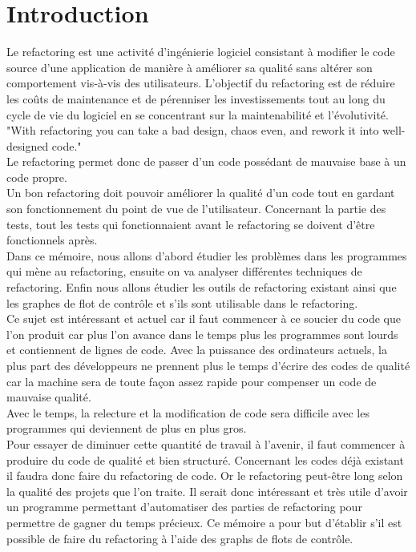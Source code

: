 \documentclass[a4paper,twoside,12pt,openright]{report}
\begin{document}
\chapter{Introduction}
Le refactoring est une activité d'ingénierie logiciel consistant à modifier le code source d'une application de manière à améliorer sa qualité sans altérer son comportement vis-à-vis des utilisateurs.
L'objectif du refactoring est de réduire les coûts de maintenance et de pérenniser les investissements tout au long du cycle de vie du logiciel en se concentrant sur la maintenabilité et l'évolutivité.\cite{ref1}\\
"With refactoring you can take a bad design, chaos even, and rework it into well-designed code."\cite{ref2}\\
Le refactoring permet donc de passer d'un code possédant de mauvaise base à un code propre.\\
Un bon refactoring doit pouvoir améliorer la qualité d'un code tout en gardant son fonctionnement du point de vue de l'utilisateur. Concernant la partie des tests, tout les tests qui fonctionnaient avant le refactoring se doivent d'être fonctionnels après.\\
Dans ce mémoire, nous allons d'abord étudier les problèmes dans les programmes qui mène au refactoring, ensuite on va analyser différentes techniques de refactoring. Enfin nous allons étudier les outils de refactoring existant ainsi que les graphes de flot de contrôle et s'ils sont utilisable dans le refactoring.\\
Ce sujet est intéressant et actuel car il faut commencer à ce soucier du code que l'on produit car plus l'on avance dans le temps plus les programmes sont lourds et contiennent de lignes de code. Avec la puissance des ordinateurs actuels, la plus part des développeurs ne prennent plus le temps d'écrire des codes de qualité car la machine sera de toute façon assez rapide pour compenser un code de mauvaise qualité.\cite{ref4}\\
Avec le temps, la relecture et la modification de code sera difficile avec les programmes qui deviennent de plus en plus gros.\cite{ref4}\\
Pour essayer de diminuer cette quantité de travail à l'avenir, il faut commencer à produire du code de qualité et bien structuré. Concernant les codes déjà existant il faudra donc faire du refactoring de code. Or le refactoring peut-être long selon la qualité des projets que l'on traite. Il serait donc intéressant et très utile d'avoir un programme permettant d'automatiser des parties de refactoring pour permettre de gagner du temps précieux. 
Ce mémoire a pour but d'établir s'il est possible de faire du refactoring à l'aide des graphs de flots de contrôle.\cite{ref3}
\end{document}
